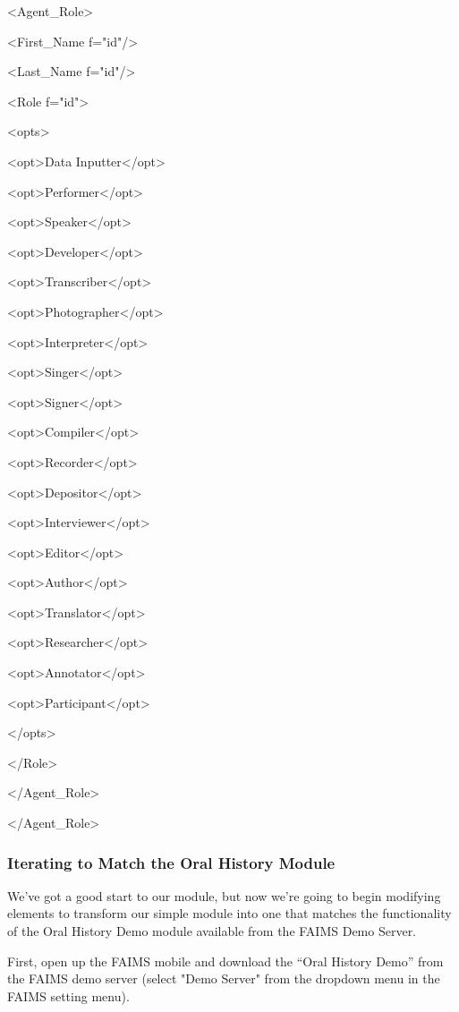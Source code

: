<Agent_Role>

<First_Name f="id"/>

<Last_Name f="id"/>

<Role f="id">

<opts>

<opt>Data Inputter</opt>

<opt>Performer</opt>

<opt>Speaker</opt>

<opt>Developer</opt>

<opt>Transcriber</opt>

<opt>Photographer</opt>

<opt>Interpreter</opt>

<opt>Singer</opt>

<opt>Signer</opt>

<opt>Compiler</opt>

<opt>Recorder</opt>

<opt>Depositor</opt>

<opt>Interviewer</opt>

<opt>Editor</opt>

<opt>Author</opt>

<opt>Translator</opt>

<opt>Researcher</opt>

<opt>Annotator</opt>

<opt>Participant</opt>

</opts>

</Role>

</Agent_Role>

</Agent_Role>

\subsubsection[section-5]{}

\subsubsection[iterating-to-match-the-oral-history-module]{Iterating to Match the Oral History Module}

We've got a good start to our module, but now we're going to begin modifying elements to transform our simple module into one that matches the functionality of the Oral History Demo module available from the FAIMS Demo Server.

First, open up the FAIMS mobile and download the “Oral History Demo” from the FAIMS demo server (select "Demo Server" from the dropdown menu in the FAIMS setting menu).

